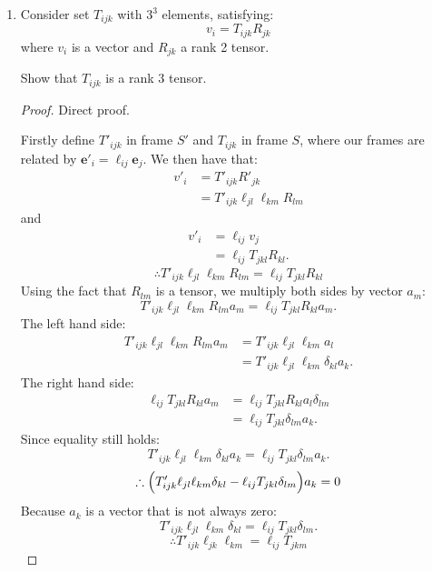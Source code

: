\pagestyle{fancy}
\fancyhead{}

\begin{enumerate}
    \item Consider set $T_{ijk}$ with $3^3$ elements, satisfying:
    $$v_i=T_{ijk}R_{jk}$$
    where $v_i$ is a vector and $R_{jk}$ a rank 2 tensor. 
    
    Show that $T_{ijk}$ is a rank 3 tensor. \\

    \begin{proof}
    Direct proof.
    
    Firstly define $T'_{ijk}$ in frame $S'$ and $T_{ijk}$ in frame $S$, where our frames are related by $\boldsymbol{e}'_i=\ell_{ij}\boldsymbol{e}_j$.
    We then have that:
    \begin{align*}
        v'_i
        &=T'_{ijk}R'_{jk} \\
        &=T'_{ijk}\ell_{jl}\ell_{km}R_{lm}
    \end{align*}
    and
    \begin{align*}
        v'_i
        &=\ell_{ij}v_j \\
        &=\ell_{ij}T_{jkl}R_{kl}.
    \end{align*}
    $$\therefore T'_{ijk}\ell_{jl}\ell_{km}R_{lm}
    =\ell_{ij}T_{jkl}R_{kl}$$
    Using the fact that $R_{lm}$ is a tensor, we multiply both sides by vector $a_m$:
    $$T'_{ijk}\ell_{jl}\ell_{km}R_{lm}a_m
    =\ell_{ij}T_{jkl}R_{kl}a_m.$$
    The left hand side:
    \begin{align*}
        T'_{ijk}\ell_{jl}\ell_{km}R_{lm}a_m
        &=T'_{ijk}\ell_{jl}\ell_{km}a_l \\
        &=T'_{ijk}\ell_{jl}\ell_{km}\delta_{kl}a_k.
    \end{align*}
    The right hand side:
    \begin{align*}
        \ell_{ij}T_{jkl}R_{kl}a_m
        &=\ell_{ij}T_{jkl}R_{kl}a_l\delta_{lm} \\
        &=\ell_{ij}T_{jkl}\delta_{lm}a_k.
    \end{align*}
    Since equality still holds:
    $$T'_{ijk}\ell_{jl}\ell_{km}\delta_{kl}a_k
    =\ell_{ij}T_{jkl}\delta_{lm}a_k.$$
    $$\therefore\Bigl(T'_{ijk}\ell_{jl}\ell_{km}\delta_{kl}
    -\ell_{ij}T_{jkl}\delta_{lm}\Bigl)a_k=0$$
    Because $a_k$ is a vector that is not always zero:
    $$T'_{ijk}\ell_{jl}\ell_{km}\delta_{kl}=
    \ell_{ij}T_{jkl}\delta_{lm}.$$
    $$\therefore T'_{ijk}\ell_{jk}\ell_{km}=
    \ell_{ij}T_{jkm}$$


\end{proof}
\end{enumerate}

